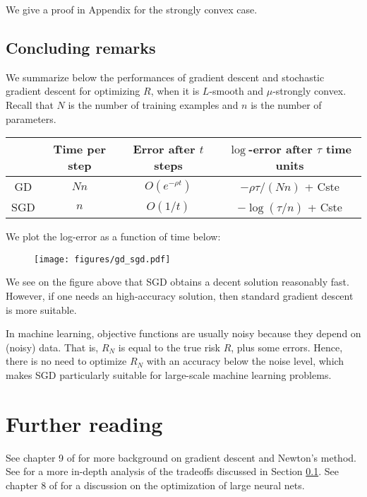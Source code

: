 \documentclass[11pt,nocut]{article}
\begin{document}
We give a proof in Appendix for the strongly convex case.

\subsection{Concluding remarks}\label{sec:concluding}

We summarize below the performances of gradient descent and stochastic gradient descent for optimizing $R$, when it is $L$-smooth and $\mu$-strongly convex. Recall that $N$ is the number of training examples and $n$ is the number of parameters.
\begin{center}
\begin{tabular}{ |c|c|c|c| } 
 \hline
 & Time per step & Error after $t$ steps & $\log$-error after $\tau$ time units \\
 \hline
	GD & $Nn$ & $O(e^{-\rho t})$ & $-\rho \tau / (Nn)$ + {\rm Cste}\\ 
	SGD & $n$ & $O(1/t)$ & $-\log(\tau / n)$ + {\rm Cste}\\ 
 \hline
\end{tabular}
\end{center}

We plot the log-error as a function of time below:

\begin{figure}[H]
	\begin{center}
		\texttt{[image: figures/gd\_sgd.pdf]}
	\end{center}
\end{figure}

We see on the figure above that SGD obtains a decent solution reasonably fast. However, if one needs an high-accuracy solution, then standard gradient descent is more suitable.

In machine learning, objective functions are usually noisy because they depend on (noisy) data. That is, $R_N$ is equal to the true risk $R$, plus some errors.
Hence, there is no need to optimize $R_N$ with an accuracy below the noise level, which makes SGD particularly suitable for large-scale machine learning problems.



\section*{Further reading}

See chapter 9 of \cite{boyd2004convex} for more background on gradient descent and Newton's method.
See \cite{bottou2008tradeoffs} for a more in-depth analysis of the tradeoffs discussed in Section \ref{sec:concluding}.
See chapter 8 of \cite{goodfellow2016deep} for a discussion on the optimization of large neural nets.
\end{document}
